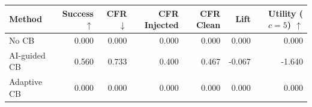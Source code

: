 \begin{tabular}{lrrrrrr}
\toprule
Method & Success $\uparrow$ & CFR $\downarrow$ & CFR Injected & CFR Clean & Lift & Utility ($c=5$) $\uparrow$ \\
\midrule
No CB & 0.000 & 0.000 & 0.000 & 0.000 & 0.000 & 0.000 \\
AI-guided CB & 0.560 & 0.733 & 0.400 & 0.467 & -0.067 & -1.640 \\
Adaptive CB & 0.000 & 0.000 & 0.000 & 0.000 & 0.000 & 0.000 \\
\bottomrule
\end{tabular}
